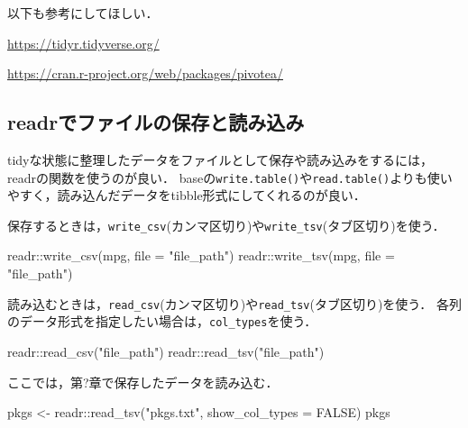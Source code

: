 \documentclass[
]{article}
\newenvironment{Shaded}{\begin{snugshade}}{\end{snugshade}}
\newcommand{\AttributeTok}[1]{\textcolor[rgb]{0.77,0.63,0.00}{#1}}
\newcommand{\ConstantTok}[1]{\textcolor[rgb]{0.00,0.00,0.00}{#1}}
\newcommand{\FunctionTok}[1]{\textcolor[rgb]{0.00,0.00,0.00}{#1}}
\newcommand{\NormalTok}[1]{#1}
\newcommand{\OtherTok}[1]{\textcolor[rgb]{0.56,0.35,0.01}{#1}}
\newcommand{\SpecialCharTok}[1]{\textcolor[rgb]{0.00,0.00,0.00}{#1}}
\newcommand{\StringTok}[1]{\textcolor[rgb]{0.31,0.60,0.02}{#1}}
\begin{document}
以下も参考にしてほしい．

\url{https://tidyr.tidyverse.org/}

\url{https://cran.r-project.org/web/packages/pivotea/}

\hypertarget{readrux3067ux30d5ux30a1ux30a4ux30ebux306eux4fddux5b58ux3068ux8aadux307fux8fbcux307f}{%
\subsection{readrでファイルの保存と読み込み}\label{readrux3067ux30d5ux30a1ux30a4ux30ebux306eux4fddux5b58ux3068ux8aadux307fux8fbcux307f}}

tidyな状態に整理したデータをファイルとして保存や読み込みをするには，readrの関数を使うのが良い．
baseの\texttt{write.table()}や\texttt{read.table()}よりも使いやすく，読み込んだデータをtibble形式にしてくれるのが良い．

保存するときは，\texttt{write\_csv}(カンマ区切り)や\texttt{write\_tsv}(タブ区切り)を使う．

\begin{Shaded}
\begin{Highlighting}[]
\NormalTok{readr}\SpecialCharTok{::}\FunctionTok{write\_csv}\NormalTok{(mpg, }\AttributeTok{file =} \StringTok{"file\_path"}\NormalTok{)}
\NormalTok{readr}\SpecialCharTok{::}\FunctionTok{write\_tsv}\NormalTok{(mpg, }\AttributeTok{file =} \StringTok{"file\_path"}\NormalTok{)}
\end{Highlighting}
\end{Shaded}

読み込むときは，\texttt{read\_csv}(カンマ区切り)や\texttt{read\_tsv}(タブ区切り)を使う．
各列のデータ形式を指定したい場合は，\texttt{col\_types}を使う．

\begin{Shaded}
\begin{Highlighting}[]
\NormalTok{readr}\SpecialCharTok{::}\FunctionTok{read\_csv}\NormalTok{(}\StringTok{"file\_path"}\NormalTok{)}
\NormalTok{readr}\SpecialCharTok{::}\FunctionTok{read\_tsv}\NormalTok{(}\StringTok{"file\_path"}\NormalTok{)}
\end{Highlighting}
\end{Shaded}

ここでは，第?章で保存したデータを読み込む．

\begin{Shaded}
\begin{Highlighting}[]
\NormalTok{pkgs }\OtherTok{\textless{}{-}}\NormalTok{ readr}\SpecialCharTok{::}\FunctionTok{read\_tsv}\NormalTok{(}\StringTok{"pkgs.txt"}\NormalTok{, }\AttributeTok{show\_col\_types =} \ConstantTok{FALSE}\NormalTok{)}
\NormalTok{pkgs}
\end{Highlighting}
\end{Shaded}
\end{document}
